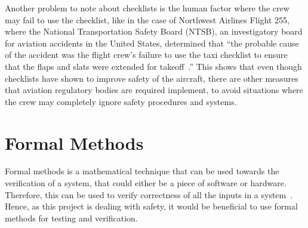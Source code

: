 \documentclass[../dissertation.tex]{subfiles}
\begin{document}
Another problem to note about checklists is the human factor where the crew
may fail to use the checklist, like in the case of Northwest Airlines Flight 255,
where the National Transportation Safety Board (NTSB), an investigatory board
for aviation accidents in the United States, determined that
\enquote{the probable cause of the accident was the flight crew's failure
to use the taxi checklist to ensure that the flaps and slats were extended for takeoff~\cite{ntsb:NWA255}.}
This shows that even though checklists have shown to improve safety of the aircraft,
there are other measures that aviation regulatory bodies are required implement, to avoid
situations where the crew may completely ignore safety procedures and systems.


\section{Formal Methods}


Formal methods is a mathematical technique that can be used towards the verification
of a system, that could either be a piece of software or hardware.
Therefore, this can be used to verify correctness of all the inputs in a system~\cite{nasa:formal}.
Hence, as this project is dealing with safety, it would be beneficial to use
formal methods for testing and verification.
\end{document}
